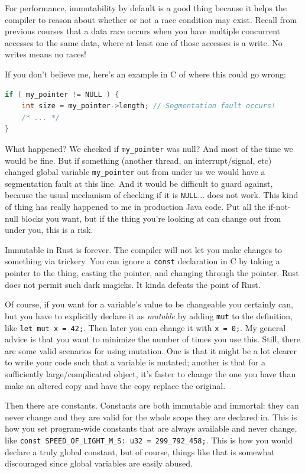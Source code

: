 For performance, immutability by default is a good thing because it helps the compiler to reason about whether or not a race condition may exist. Recall from previous courses that a data race occurs when you have multiple concurrent accesses to the same data, where at least one of those accesses is a write. No writes means no races! 

If you don't believe me, here's an example in C of where this could go wrong:
\begin{lstlisting}[language=C]
if ( my_pointer != NULL ) {
    int size = my_pointer->length; // Segmentation fault occurs!
    /* ... */
}
\end{lstlisting}

What happened? We checked if \texttt{my\_pointer} was null? And most of the time we would be fine. But if something (another thread, an interrupt/signal, etc) changed global variable \texttt{my\_pointer} out from under us we would have a segmentation fault at this line. And it would be difficult to guard against, because the usual mechanism of checking if it is \texttt{NULL}... does not work. This kind of thing has really happened to me in production Java code. Put all the if-not-null blocks you want, but if the thing you're looking at can change out from under you, this is a risk.

Immutable in Rust is forever. The compiler will not let you make changes to something via trickery. You can ignore a \texttt{const} declaration in C by taking a pointer to the thing, casting the pointer, and changing through the pointer. Rust does not permit such dark magicks. It kinda defeats the point of Rust.

Of course, if you want for a variable's value to be changeable you certainly can, but you have to explicitly declare it as \textit{mutable} by adding \texttt{mut} to the definition, like \texttt{let mut x = 42;}. Then later you can change it with \texttt{x = 0;}. My general advice is that you want to minimize the number of times you use this. Still, there are some valid scenarios for using mutation. One is that it might be a lot clearer to write your code such that a variable is mutated; another is that for a sufficiently large/complicated object, it's faster to change the one you have than make an altered copy and have the copy replace the original.

Then there are constants. Constants are both immutable and immortal: they can never change and they are valid for the whole scope they are declared in. This is how you set program-wide constants that are always available and never change, like \texttt{const SPEED\_OF\_LIGHT\_M\_S: u32 = 299\_792\_458;}. This is how you would declare a truly global constant, but of course, things like that is somewhat discouraged since global variables are easily abused.

